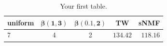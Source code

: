\documentclass[a4paper, 11pt]{article}
\begin{document}
\begin{table}[h!]
  \begin{center}
    \label{tab:table3}
    \begin{tabular}{l|c|c|c|r} %
      \textbf{uniform} & $\mathbf{\beta(1, 3)}$ & $\mathbf{\beta(0.1,2)}$ & \textbf{TW} & \textbf{sNMF}\\
      \hline
      7 & 4 & 2 & $134.42$ & $118.16$\\
    \end{tabular}
    \caption{Your first table.}
  \end{center}
\end{table}
\end{document}
